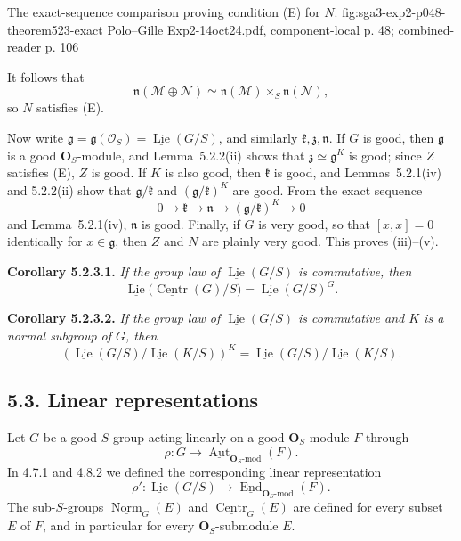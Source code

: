   {The exact-sequence comparison proving condition (E) for \(N\).}
  {fig:sga3-exp2-p048-theorem523-exact}
  {Polo--Gille Exp2-14oct24.pdf, component-local p. 48;
   combined-reader p. 106}

It follows that
\[
 \mathfrak n(\mathscr M\oplus\mathscr N)
 \simeq\mathfrak n(\mathscr M)\times_S\mathfrak n(\mathscr N),
\]
so \(N\) satisfies (E).

Now write
\(\mathfrak g=\mathfrak g(\mathscr O_S)
=\underline{\operatorname{Lie}}(G/S)\), and similarly
\(\mathfrak k,\mathfrak z,\mathfrak n\). If \(G\) is good, then
\(\mathfrak g\) is a good \(\mathbf O_S\)-module, and Lemma~5.2.2(ii)
shows that \(\mathfrak z\simeq\mathfrak g^K\) is good; since \(Z\)
satisfies (E), \(Z\) is good. If \(K\) is also good, then
\(\mathfrak k\) is good, and Lemmas~5.2.1(iv) and 5.2.2(ii) show that
\(\mathfrak g/\mathfrak k\) and
\((\mathfrak g/\mathfrak k)^K\) are good. From the exact sequence
\[
 0\longrightarrow\mathfrak k\longrightarrow\mathfrak n
 \longrightarrow(\mathfrak g/\mathfrak k)^K\longrightarrow0
\]
and Lemma~5.2.1(iv), \(\mathfrak n\) is good. Finally, if \(G\) is
very good, so that \([x,x]=0\) identically for \(x\in\mathfrak g\),
then \(Z\) and \(N\) are plainly very good. This proves (iii)--(v).

\medskip
\noindent\textbf{Corollary 5.2.3.1.}
\textit{If the group law of
\(\underline{\operatorname{Lie}}(G/S)\) is commutative, then}
\[
 \underline{\operatorname{Lie}}
   \bigl(\underline{\operatorname{Centr}}(G)/S\bigr)
 =\underline{\operatorname{Lie}}(G/S)^G.
\]

\medskip
\noindent\textbf{Corollary 5.2.3.2.}
\textit{If the group law of
\(\underline{\operatorname{Lie}}(G/S)\) is commutative and \(K\) is a
normal subgroup of \(G\), then}
\[
 \left(
 \underline{\operatorname{Lie}}(G/S)/
 \underline{\operatorname{Lie}}(K/S)
 \right)^K
 =
 \underline{\operatorname{Lie}}(G/S)/
 \underline{\operatorname{Lie}}(K/S).
\]

\subsection*{5.3. Linear representations}

Let \(G\) be a good \(S\)-group acting linearly on a good
\(\mathbf O_S\)-module \(F\) through
\[
 \rho:G\longrightarrow
 \underline{\operatorname{Aut}}_{\mathbf O_S\text{-}\mathrm{mod}}(F).
\]
In 4.7.1 and 4.8.2 we defined the corresponding linear representation
\[
 \rho':
 \underline{\operatorname{Lie}}(G/S)
 \longrightarrow
 \underline{\operatorname{End}}_{\mathbf O_S\text{-}\mathrm{mod}}(F).
\]
The sub-\(S\)-groups
\(\underline{\operatorname{Norm}}_G(E)\) and
\(\underline{\operatorname{Centr}}_G(E)\) are defined for every subset
\(E\) of \(F\), and in particular for every
\(\mathbf O_S\)-submodule \(E\).

